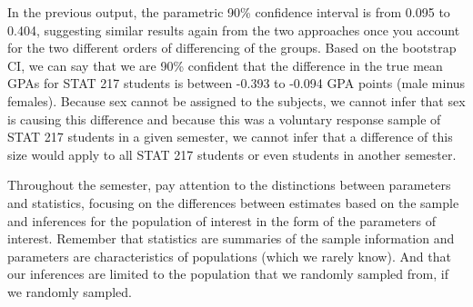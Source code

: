 \documentclass[]{book}
\newenvironment{Shaded}{\begin{snugshade}}{\end{snugshade}}
\newcommand{\KeywordTok}[1]{\textcolor[rgb]{0.13,0.29,0.53}{\textbf{#1}}}
\newcommand{\DataTypeTok}[1]{\textcolor[rgb]{0.13,0.29,0.53}{#1}}
\newcommand{\DecValTok}[1]{\textcolor[rgb]{0.00,0.00,0.81}{#1}}
\newcommand{\StringTok}[1]{\textcolor[rgb]{0.31,0.60,0.02}{#1}}
\newcommand{\OperatorTok}[1]{\textcolor[rgb]{0.81,0.36,0.00}{\textbf{#1}}}
\newcommand{\NormalTok}[1]{#1}
\theoremstyle{definition}
\theoremstyle{definition}
\theoremstyle{remark}
\begin{document}
\begin{Shaded}
\end{Shaded}

In the previous output, the parametric 90\% confidence interval is from
0.095 to 0.404, suggesting similar results again from the two approaches
once you account for the two different orders of differencing of the
groups. Based on the bootstrap CI, we can say that we are 90\% confident
that the difference in the true mean GPAs for STAT 217 students is
between -0.393 to -0.094 GPA points (male minus females). Because sex
cannot be assigned to the subjects, we cannot infer that sex is causing
this difference and because this was a voluntary response sample of STAT
217 students in a given semester, we cannot infer that a difference of
this size would apply to all STAT 217 students or even students in
another semester.

Throughout the semester, pay attention to the distinctions between
parameters and statistics, focusing on the differences between estimates
based on the sample and inferences for the population of interest in the
form of the parameters of interest. Remember that statistics are
summaries of the sample information and parameters are characteristics
of populations (which we rarely know). And that our inferences are
limited to the population that we randomly sampled from, if we randomly
sampled.
\end{document}
